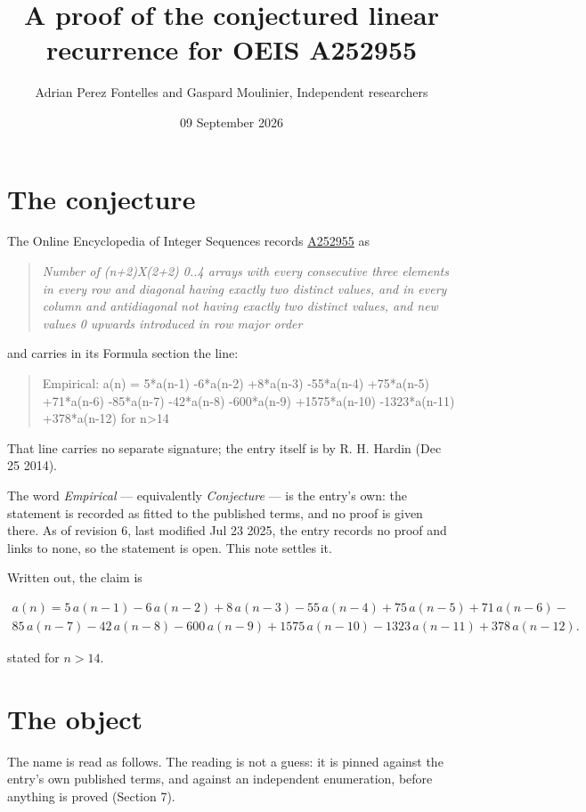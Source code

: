 \documentclass[11pt]{article}
\title{A proof of the conjectured linear recurrence for OEIS A252955}
\author{Adrian Perez Fontelles and Gaspard Moulinier, Independent researchers}
\date{09 September 2026}
\theoremstyle{definition}
\begin{document}
\maketitle
\section{The conjecture}

The Online Encyclopedia of Integer Sequences records \href{https://oeis.org/A252955}{A252955} as

\begin{quote}\itshape Number of (n+2)X(2+2) 0..4 arrays with every consecutive three elements in every row and diagonal having exactly two distinct values, and in every column and antidiagonal not having exactly two distinct values, and new values 0 upwards introduced in row major order\end{quote}

and carries in its Formula section the line:

\begin{quote}\ttfamily Empirical: a(n) = 5*a(n-1) -6*a(n-2) +8*a(n-3) -55*a(n-4) +75*a(n-5) +71*a(n-6) -85*a(n-7) -42*a(n-8) -600*a(n-9) +1575*a(n-10) -1323*a(n-11) +378*a(n-12) for n>14\end{quote}

That line carries no separate signature; the entry itself is by R. H. Hardin (Dec 25 2014).

The word {\itshape Empirical} --- equivalently {\itshape Conjecture} --- is the entry's own: the statement is recorded as fitted to the published terms, and no proof is given there. As of revision 6, last modified Jul 23 2025, the entry records no proof and links to none, so the statement is open. This note settles it.

Written out, the claim is

\begin{multline*} a(n) = 5\,a(n-1) - 6\,a(n-2) + 8\,a(n-3) - 55\,a(n-4) + 75\,a(n-5) + 71\,a(n-6) - \\ 85\,a(n-7) - 42\,a(n-8) - 600\,a(n-9) + 1575\,a(n-10) - 1323\,a(n-11) + 378\,a(n-12). \end{multline*}

stated for $n > 14$.

\section{The object}

The name is read as follows. The reading is not a guess: it is pinned against the entry's own published terms, and against an independent enumeration, before anything is proved (Section 7).
\end{document}
